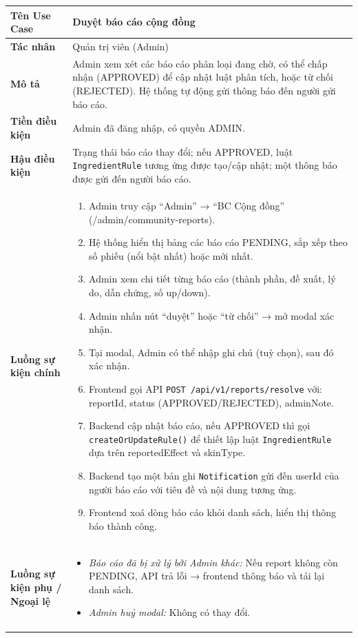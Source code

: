 \documentclass[12pt,a4paper]{article}
\begin{document}
\begin{center}
\renewcommand{\arraystretch}{1.4}
\begin{tabular}{|p{4cm}|p{10cm}|}
\hline
\rowcolor{blue!15}
\textbf{Tên Use Case} & \textbf{Duyệt báo cáo cộng đồng} \\ \hline
\textbf{Tác nhân} & Quản trị viên (Admin) \\ \hline
\textbf{Mô tả} & Admin xem xét các báo cáo phân loại đang chờ, có thể chấp nhận (APPROVED) để cập nhật luật phân tích, hoặc từ chối (REJECTED). Hệ thống tự động gửi thông báo đến người gửi báo cáo. \\ \hline
\textbf{Tiền điều kiện} & Admin đã đăng nhập, có quyền ADMIN. \\ \hline
\textbf{Hậu điều kiện} & Trạng thái báo cáo thay đổi; nếu APPROVED, luật \texttt{IngredientRule} tương ứng được tạo/cập nhật; một thông báo được gửi đến người báo cáo. \\ \hline
\textbf{Luồng sự kiện chính} & 
\begin{enumerate}
    \item Admin truy cập “Admin” → “BC Cộng đồng” (/admin/community-reports).
    \item Hệ thống hiển thị bảng các báo cáo PENDING, sắp xếp theo số phiếu (nổi bật nhất) hoặc mới nhất.
    \item Admin xem chi tiết từng báo cáo (thành phần, đề xuất, lý do, dẫn chứng, số up/down).
    \item Admin nhấn nút ``duyệt'' hoặc ``từ chối'' → mở modal xác nhận.
    \item Tại modal, Admin có thể nhập ghi chú (tuỳ chọn), sau đó xác nhận.
    \item Frontend gọi API \texttt{POST /api/v1/reports/resolve} với: reportId, status (APPROVED/REJECTED), adminNote.
    \item Backend cập nhật báo cáo, nếu APPROVED thì gọi \texttt{createOrUpdateRule()} để thiết lập luật \texttt{IngredientRule} dựa trên reportedEffect và skinType.
    \item Backend tạo một bản ghi \texttt{Notification} gửi đến userId của người báo cáo với tiêu đề và nội dung tương ứng.
    \item Frontend xoá dòng báo cáo khỏi danh sách, hiển thị thông báo thành công.
\end{enumerate} \\ \hline
\textbf{Luồng sự kiện phụ / Ngoại lệ} & 
\begin{itemize}
    \item \textit{Báo cáo đã bị xử lý bởi Admin khác:} Nếu report không còn PENDING, API trả lỗi → frontend thông báo và tải lại danh sách.
    \item \textit{Admin huỷ modal:} Không có thay đổi.
\end{itemize} \\ \hline
\end{tabular}
\end{center}
\end{document}
